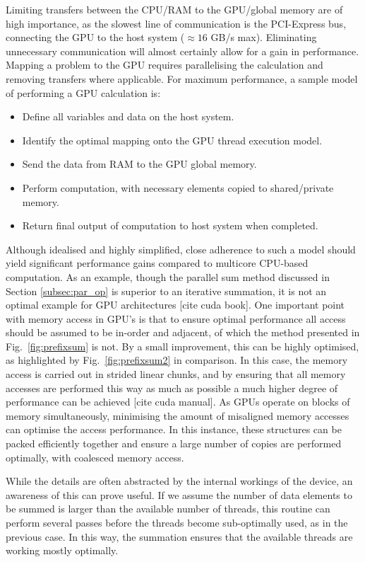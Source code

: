 Limiting transfers between the CPU/RAM to the GPU/global memory are of high importance, as the slowest line of communication is the PCI-Express bus, connecting the GPU to the host system ($\approx 16 $ GB/s max). Eliminating unnecessary communication will almost certainly allow for a gain in performance. Mapping a problem to the GPU requires parallelising the calculation and removing transfers where applicable. For maximum performance, a sample model of performing a GPU calculation is:
\begin{itemize}
    \item Define all variables and data on the host system.
    \item Identify the optimal mapping onto the GPU thread execution model.
    \item Send the data from RAM to the GPU global memory.
    \item Perform computation, with necessary elements copied to shared/private memory.
    \item Return final output of computation to host system when completed.
\end{itemize}

Although idealised and highly simplified, close adherence to such a model should yield significant performance gains compared to multicore CPU-based computation. As an example, though the parallel sum method discussed in Section \ref{subsec:par_op} is superior to an iterative summation, it is not an optimal example for GPU architectures [cite cuda book]. One important point with memory access in GPU's is that to ensure optimal performance all access should be assumed to be in-order and adjacent, of which the method presented in Fig.~\ref{fig:prefixsum} is not. By a small improvement, this can be highly optimised, as highlighted by Fig.~\ref{fig:prefixsum2} in comparison. In this case, the memory access is carried out in strided linear chunks, and by ensuring that all memory accesses are performed this way as much as possible a much higher degree of performance can be achieved [cite cuda manual]. As GPUs operate on blocks of memory simultaneously, minimising the amount of misaligned memory accesses can optimise the access performance. In this instance, these structures can be packed efficiently together and ensure a large number of copies are performed optimally, with coalesced memory access.

While the details are often abstracted by the internal workings of the device, an awareness of this can prove useful. If we assume the number of data elements to be summed is larger than the available number of threads, this routine can perform several passes before the threads become sub-optimally used, as in the previous case. In this way, the summation ensures that the available threads are working mostly optimally.

